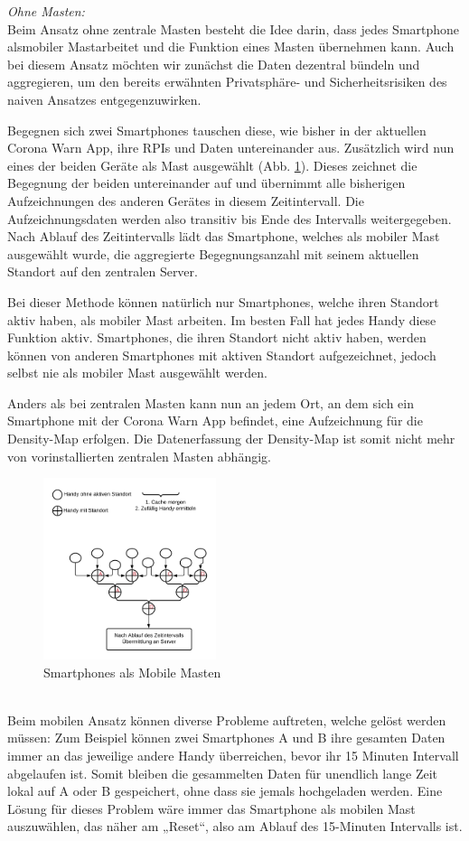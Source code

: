 \documentclass[conference,compsoc]{IEEEtran}
\begin{document}
\textit{Ohne Masten:}\\
Beim Ansatz ohne zentrale Masten besteht die Idee darin, dass jedes Smartphone als\glqq mobiler Mast\grqq arbeitet und die Funktion eines Masten übernehmen kann.
Auch bei diesem Ansatz möchten wir zunächst die Daten dezentral bündeln und aggregieren, um den bereits erwähnten Privatsphäre- und Sicherheitsrisiken des naiven Ansatzes entgegenzuwirken.  

Begegnen sich zwei Smartphones tauschen diese, wie bisher in der aktuellen Corona Warn App, ihre RPIs und Daten untereinander aus. 
Zusätzlich wird nun eines der beiden Geräte als Mast ausgewählt (Abb. \ref{mobile_mast}). 
Dieses zeichnet die Begegnung der beiden untereinander auf und übernimmt alle bisherigen Aufzeichnungen des anderen Gerätes in diesem Zeitintervall.
Die Aufzeichnungsdaten werden also transitiv bis Ende des Intervalls weitergegeben. 
Nach Ablauf des Zeitintervalls lädt das Smartphone, welches als mobiler Mast ausgewählt wurde, die aggregierte Begegnungsanzahl mit seinem aktuellen Standort auf den zentralen Server.

Bei dieser Methode können natürlich nur Smartphones, welche ihren Standort aktiv haben, als mobiler Mast arbeiten. 
Im besten Fall hat jedes Handy diese Funktion aktiv. Smartphones, die ihren Standort nicht aktiv haben, werden können von anderen Smartphones mit aktiven Standort aufgezeichnet, jedoch selbst nie als mobiler Mast ausgewählt werden.

Anders als bei zentralen Masten kann nun an jedem Ort, an dem sich ein Smartphone mit der Corona Warn App befindet, eine Aufzeichnung für die Density-Map erfolgen. 
Die Datenerfassung der Density-Map ist somit nicht mehr von vorinstallierten zentralen Masten abhängig.\\
\begin{figure}[h]
	\centering
	\includegraphics[width=0.45\textwidth]{"Mobile_Mast"}
	\caption{Smartphones als Mobile Masten}
	\label{mobile_mast}
\end{figure} \\
Beim mobilen Ansatz können diverse Probleme auftreten, welche gelöst werden müssen: Zum Beispiel können zwei Smartphones A und B ihre gesamten Daten immer an das jeweilige andere Handy überreichen, bevor ihr 15 Minuten Intervall abgelaufen ist. 
Somit bleiben die gesammelten Daten für unendlich lange Zeit lokal auf A oder B gespeichert, ohne dass sie jemals hochgeladen werden. 
Eine Lösung für dieses Problem wäre immer das Smartphone als mobilen Mast auszuwählen, das näher am „Reset“, also am Ablauf des 15-Minuten Intervalls ist.
\end{document}
